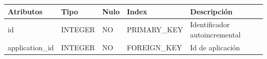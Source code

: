 \documentclass[12pt,a4paperpaper,]{report}
\begin{document}
\begin{longtable}[]{@{}lllll@{}}
\toprule
\begin{minipage}[b]{0.21\columnwidth}\raggedright\strut
Atributos\strut
\end{minipage} & \begin{minipage}[b]{0.19\columnwidth}\raggedright\strut
Tipo\strut
\end{minipage} & \begin{minipage}[b]{0.16\columnwidth}\raggedright\strut
Nulo\strut
\end{minipage} & \begin{minipage}[b]{0.19\columnwidth}\raggedright\strut
Index\strut
\end{minipage} & \begin{minipage}[b]{0.11\columnwidth}\raggedright\strut
Descripción\strut
\end{minipage}\tabularnewline
\midrule
\endhead
\begin{minipage}[t]{0.21\columnwidth}\raggedright\strut
id\strut
\end{minipage} & \begin{minipage}[t]{0.19\columnwidth}\raggedright\strut
INTEGER\strut
\end{minipage} & \begin{minipage}[t]{0.16\columnwidth}\raggedright\strut
NO\strut
\end{minipage} & \begin{minipage}[t]{0.19\columnwidth}\raggedright\strut
PRIMARY\_KEY\strut
\end{minipage} & \begin{minipage}[t]{0.11\columnwidth}\raggedright\strut
Identificador autoincremental\strut
\end{minipage}\tabularnewline
\begin{minipage}[t]{0.21\columnwidth}\raggedright\strut
application\_id\strut
\end{minipage} & \begin{minipage}[t]{0.19\columnwidth}\raggedright\strut
INTEGER\strut
\end{minipage} & \begin{minipage}[t]{0.16\columnwidth}\raggedright\strut
NO\strut
\end{minipage} & \begin{minipage}[t]{0.19\columnwidth}\raggedright\strut
FOREIGN\_KEY\strut
\end{minipage} & \begin{minipage}[t]{0.11\columnwidth}\raggedright\strut
Id de aplicación\strut

\end{minipage}
\end{longtable}
\end{document}
